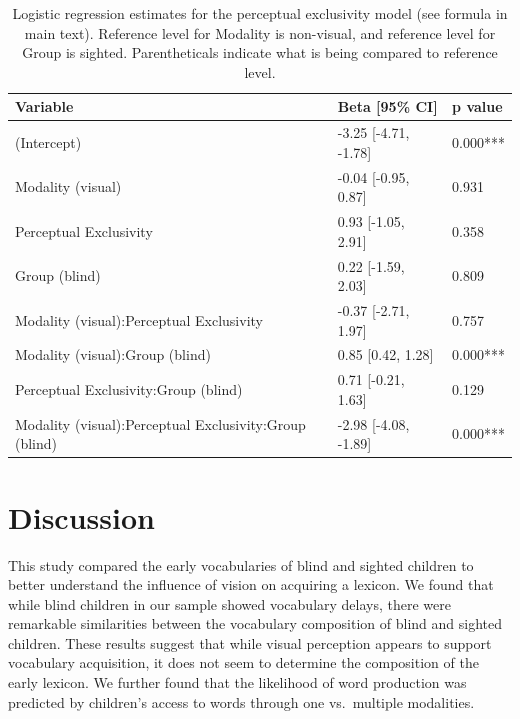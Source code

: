 \documentclass[
  man,floatsintext]{apa6}
\begin{document}
\begin{table}[H]

\caption{\label{tab:excl-table}Logistic regression estimates for the perceptual exclusivity model (see formula in main text). Reference level for Modality is non-visual, and reference level for Group is sighted. Parentheticals indicate what is being compared to reference level.}
\centering
\begin{tabular}[t]{l|l|l}
\hline
Variable & Beta [95\% CI] & p value\\
\hline
(Intercept) & -3.25 [-4.71, -1.78] & 0.000***\\
\hline
Modality (visual) & -0.04 [-0.95, 0.87] & 0.931\\
\hline
Perceptual Exclusivity & 0.93 [-1.05, 2.91] & 0.358\\
\hline
Group (blind) & 0.22 [-1.59, 2.03] & 0.809\\
\hline
Modality (visual):Perceptual Exclusivity & -0.37 [-2.71, 1.97] & 0.757\\
\hline
Modality (visual):Group (blind) & 0.85 [0.42, 1.28] & 0.000***\\
\hline
Perceptual Exclusivity:Group (blind) & 0.71 [-0.21, 1.63] & 0.129\\
\hline
Modality (visual):Perceptual Exclusivity:Group (blind) & -2.98 [-4.08, -1.89] & 0.000***\\
\hline
\end{tabular}
\end{table}

\hypertarget{discussion}{%
\section{Discussion}\label{discussion}}

This study compared the early vocabularies of blind and sighted children to better understand the influence of vision on acquiring a lexicon. We found that while blind children in our sample showed vocabulary delays, there were remarkable similarities between the vocabulary composition of blind and sighted children. These results suggest that while visual perception appears to support vocabulary acquisition, it does not seem to determine the composition of the early lexicon. We further found that the likelihood of word production was predicted by children's access to words through one vs.~multiple modalities.
\end{document}
